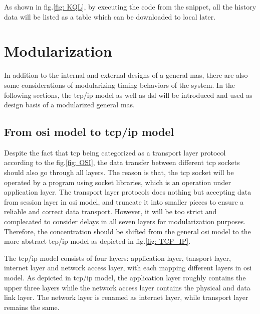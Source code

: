 As shown in fig.\ref{fig: KQL}, by executing the code from the snippet, all the history data will be listed as a table 
which can be downloaded to local later. 


\section{Modularization}\label{chap: Meth-Modular}
In addition to the internal and external designs of a general \gls{mas}, 
there are also some considerations of modularizing timing behaviors of the 
system. In the following sections, the \gls{tcp/ip} model as well as 
\gls{dsl} will be introduced and used as design basis of a modularized general 
\gls{mas}. 
\subsection{From \gls{osi} model to \gls{tcp/ip} model}

Despite the fact that \gls{tcp} being categorized as a transport layer protocol 
according to the fig.\ref{fig: OSI}, the data transfer
between different \gls{tcp} sockets should also go through all layers. 
The reason is that, the \gls{tcp} socket will be operated by a program 
using socket libraries, which is an operation under application layer. 
The transport layer protocols does nothing but accepting data from session layer 
in \gls{osi} model, and truncate it into smaller pieces to ensure a reliable and correct
data transport. However, it will be too strict and complecated 
to consider delays in all seven 
layers for modularization purposes. Therefore, the concentration should be 
shifted from the general \gls{osi} model to the more abstract \gls{tcp/ip} model 
as depicted in fig.\ref{fig: TCP_IP}. 


The \gls{tcp/ip} model consists of four layers: application layer, tansport layer, 
internet layer and network access layer, with each mapping different layers in 
\gls{osi} model. As depicted in \gls{tcp/ip} model, 
the application layer roughly contains the upper three layers while the network access layer 
contains the physical and data link layer. The network layer is renamed as internet layer, 
while transport layer remains the same. 

